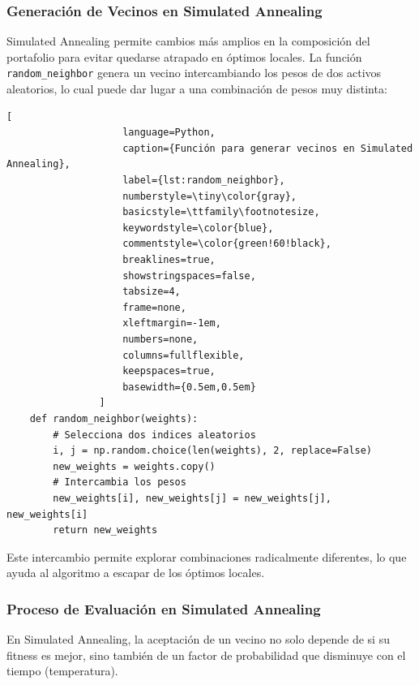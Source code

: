 \documentclass[9pt,a4paper,twoside]{rho-class/rho}
\begin{document}
            \subsubsection{Generación de Vecinos en Simulated Annealing}
                Simulated Annealing permite cambios más amplios en la composición del portafolio para evitar quedarse atrapado en óptimos locales. La función \texttt{random\_neighbor} genera un vecino intercambiando los pesos de dos activos aleatorios, lo cual puede dar lugar a una combinación de pesos muy distinta:
                \begin{lstlisting}[
                    language=Python,
                    caption={Función para generar vecinos en Simulated Annealing},
                    label={lst:random_neighbor},
                    numberstyle=\tiny\color{gray},
                    basicstyle=\ttfamily\footnotesize,
                    keywordstyle=\color{blue},
                    commentstyle=\color{green!60!black},
                    breaklines=true,
                    showstringspaces=false,
                    tabsize=4,
                    frame=none,
                    xleftmargin=-1em,
                    numbers=none,
                    columns=fullflexible,
                    keepspaces=true,
                    basewidth={0.5em,0.5em}
                ]
    def random_neighbor(weights):
        # Selecciona dos indices aleatorios
        i, j = np.random.choice(len(weights), 2, replace=False)
        new_weights = weights.copy()
        # Intercambia los pesos
        new_weights[i], new_weights[j] = new_weights[j], new_weights[i]
        return new_weights
                \end{lstlisting}
                Este intercambio permite explorar combinaciones radicalmente diferentes, lo que ayuda al algoritmo a escapar de los óptimos locales.
            \subsubsection{Proceso de Evaluación en Simulated Annealing}
                En Simulated Annealing, la aceptación de un vecino no solo depende de si su fitness es mejor, sino también de un factor de probabilidad que disminuye con el tiempo (temperatura).
            
\end{document}
